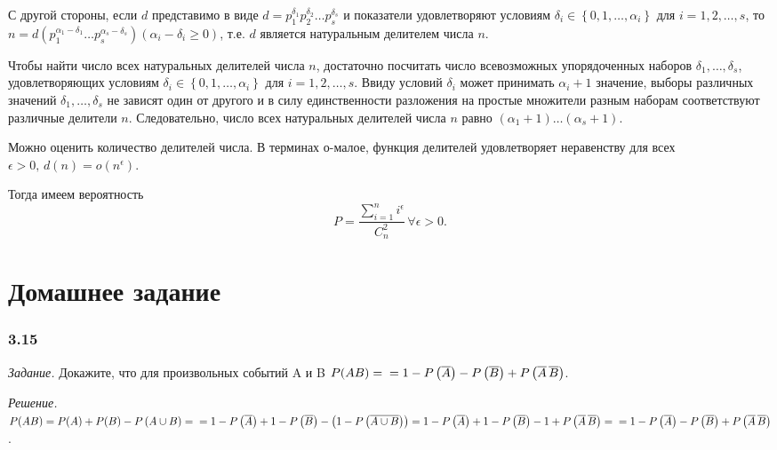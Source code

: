 С другой стороны, если $d$ представимо в виде
$d =
p_1^{ \delta_1} p_2^{ \delta_2} \dotsc p_s^{ \delta_s}$
и показатели удовлетворяют условиям
$ \delta_i \in \left\{ 0, 1, \dotsc, \alpha_i \right\}$
для $i = 1, 2, \dotsc, s$, то
$n =
d \left( p_1^{ \alpha_1 - \delta_1} \dotsc p_s^{ \alpha_s - \delta_s} \right) \left( \alpha_i - \delta_i \geq 0 \right)$,
т.е. $d$ является натуральным делителем числа $n$.

Чтобы найти число всех натуральных делителей числа $n$,
достаточно посчитать число всевозможных упорядоченных наборов
$ \delta_1, \dotsc, \delta_s$, удовлетворяющих условиям
$ \delta_i \in \left\{ 0, 1, \dotsc, \alpha_i \right\}$ для $i = 1, 2, \dotsc, s$.
Ввиду условий $ \delta_i$ может принимать $ \alpha_i + 1$ значение,
выборы различных значений $ \delta_1, \dotsc, \delta_s$
не зависят один от другого
и в силу единственности разложения на простые множители разным наборам соответствуют различные делители $n$.
Следовательно, число всех натуральных делителей числа $n$ равно
$ \left( \alpha_1 + 1 \right) \dotsc \left( \alpha_s + 1 \right)$.

Можно оценить количество делителей числа.
В терминах о-малое,
функция делителей удовлетворяет неравенству для всех $ \epsilon > 0, \, d \left( n \right) = o \left( n^{\epsilon} \right)$.

Тогда имеем вероятность
$$P =
\frac{ \sum \limits_{i=1}^n i^{\epsilon}}{C_n^2} \, \forall \epsilon > 0.$$

\section*{Домашнее задание}

\subsubsection*{3.15}

\textit{Задание.} Докажите, что для произвольных событий A и B
$ P( AB ) = \\
= 1 - P\left( \overline{ A } \right) - P \left( \overline{ B } \right) + P \left( \overline{ A } \, \overline{ B } \right) $.

\textit{Решение.}
$ P( AB ) =
P(A) + P(B) - P \left( A \cup B \right) = \\
= 1 - P \left( \overline{ A }\right) + 1 - P \left( \overline{ B } \right) - \left( 1 - P \left( \overline{ A \cup B } \right) \right) =
1 - P \left( \overline{ A } \right) + 1 - P \left( \overline{ B } \right) - 1 + P \left( \overline{ A } \, \overline{ B } \right) = \\
= 1 - P \left( \overline{ A } \right) - P \left( \overline{ B } \right) + P \left( \overline{ A } \, \overline{ B } \right) $.

